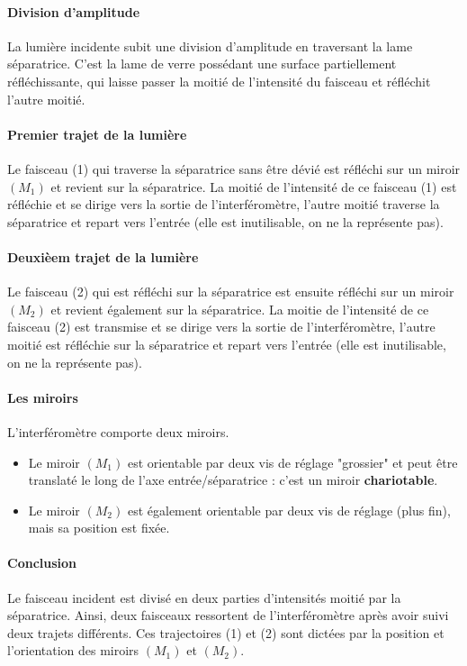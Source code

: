 \documentclass[french]{book}
\theoremstyle{plain}
\theoremstyle{definition}
\theoremstyle{remark}
\begin{document}
\paragraph{Division d'amplitude} La lumière incidente subit une division d'amplitude en traversant la lame séparatrice. C'est la lame de verre possédant une surface partiellement réfléchissante, qui laisse passer la moitié de l'intensité du faisceau et réfléchit l'autre moitié.
\paragraph{Premier trajet de la lumière} Le faisceau (1) qui traverse la séparatrice sans être dévié est réfléchi sur un miroir $(M_1)$ et revient sur la séparatrice. La moitié de l'intensité de ce faisceau (1) est réfléchie et se dirige vers la sortie de l'interféromètre, l'autre moitié traverse la séparatrice et repart vers l'entrée (elle est inutilisable, on ne la représente pas).
\paragraph{Deuxièem trajet de la lumière} Le faisceau (2) qui est réfléchi sur la séparatrice est ensuite réfléchi sur un miroir $(M_2)$ et revient  également sur la séparatrice. La moitie de l'intensité de ce faisceau (2) est transmise et se dirige vers la sortie de l'interféromètre, l'autre moitié est réfléchie sur la séparatrice et repart vers l'entrée (elle est inutilisable, on ne la représente pas).
\paragraph{Les miroirs} L'interféromètre comporte deux miroirs.
\begin{itemize}
	\item Le miroir $(M_1)$ est orientable par deux vis de réglage "grossier" et peut être translaté le long de l'axe entrée/séparatrice : c'est un miroir \textbf{chariotable}.
	\item Le miroir $(M_2)$ est également orientable par deux vis de réglage (plus fin), mais sa position est fixée.
\end{itemize}
\paragraph{Conclusion} Le faisceau incident est divisé en deux parties d'intensités moitié par la séparatrice. Ainsi, deux faisceaux ressortent de l'interféromètre après avoir suivi deux trajets différents. Ces trajectoires (1) et (2) sont dictées par la position et l'orientation des miroirs $(M_1)$ et $(M_2)$.
\end{document}
